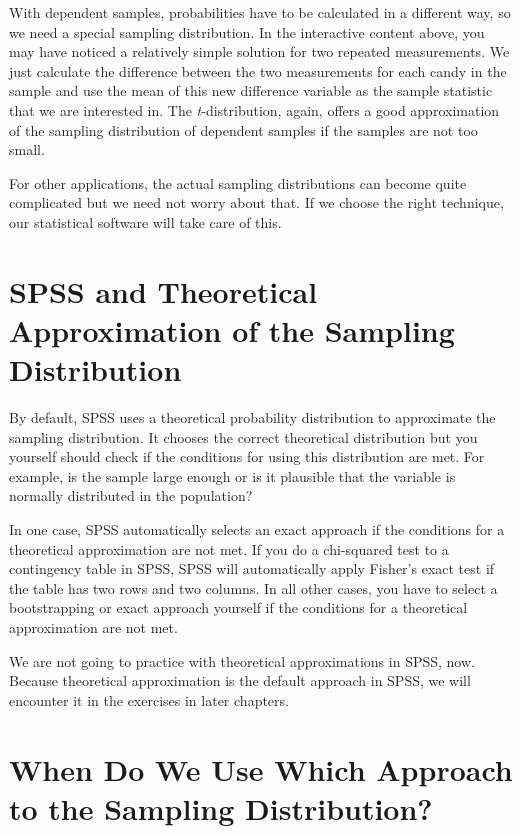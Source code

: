 \documentclass[a4paper]{book}
\theoremstyle{definition}
\theoremstyle{definition}
\theoremstyle{definition}
\theoremstyle{remark}
\begin{document}
With dependent samples, probabilities have to be calculated in a
different way, so we need a special sampling distribution. In the
interactive content above, you may have noticed a relatively simple
solution for two repeated measurements. We just calculate the difference
between the two measurements for each candy in the sample and use the
mean of this new difference variable as the sample statistic that we are
interested in. The \emph{t}-distribution, again, offers a good
approximation of the sampling distribution of dependent samples if the
samples are not too small.

For other applications, the actual sampling distributions can become
quite complicated but we need not worry about that. If we choose the
right technique, our statistical software will take care of this.

\section{SPSS and Theoretical Approximation of the Sampling
Distribution}\label{spss-and-theoretical-approximation-of-the-sampling-distribution}

By default, SPSS uses a theoretical probability distribution to
approximate the sampling distribution. It chooses the correct
theoretical distribution but you yourself should check if the conditions
for using this distribution are met. For example, is the sample large
enough or is it plausible that the variable is normally distributed in
the population?

In one case, SPSS automatically selects an exact approach if the
conditions for a theoretical approximation are not met. If you do a
chi-squared test to a contingency table in SPSS, SPSS will automatically
apply Fisher's exact test if the table has two rows and two columns. In
all other cases, you have to select a bootstrapping or exact approach
yourself if the conditions for a theoretical approximation are not met.

We are not going to practice with theoretical approximations in SPSS,
now. Because theoretical approximation is the default approach in SPSS,
we will encounter it in the exercises in later chapters.

\section{When Do We Use Which Approach to the Sampling
Distribution?}\label{when-do-we-use-which-approach-to-the-sampling-distribution}
\end{document}

